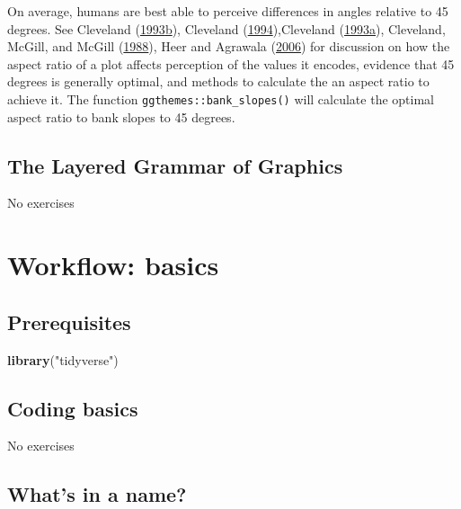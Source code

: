 \documentclass[]{book}
\newenvironment{Shaded}{\begin{snugshade}}{\end{snugshade}}
\newcommand{\KeywordTok}[1]{\textcolor[rgb]{0.13,0.29,0.53}{\textbf{#1}}}
\newcommand{\NormalTok}[1]{#1}
\newcommand{\StringTok}[1]{\textcolor[rgb]{0.31,0.60,0.02}{#1}}
\theoremstyle{plain}
\theoremstyle{remark}
\begin{document}
On average, humans are best able to perceive differences in angles relative to 45 degrees.
See Cleveland (\protect\hyperlink{ref-Cleveland1993}{1993}\protect\hyperlink{ref-Cleveland1993}{b}), Cleveland (\protect\hyperlink{ref-Cleveland1994}{1994}),Cleveland (\protect\hyperlink{ref-Cleveland1993a}{1993}\protect\hyperlink{ref-Cleveland1993a}{a}), Cleveland, McGill, and McGill (\protect\hyperlink{ref-ClevelandMcGillMcGill1988}{1988}), Heer and Agrawala (\protect\hyperlink{ref-HeerAgrawala2006}{2006}) for discussion on how the aspect ratio of a plot affects perception of the values it encodes, evidence that 45 degrees is generally optimal, and methods to calculate the an aspect ratio to achieve it.
The function \texttt{ggthemes::bank\_slopes()} will calculate the optimal aspect ratio to bank slopes to 45 degrees.

\hypertarget{the-layered-grammar-of-graphics}{%
\section{The Layered Grammar of Graphics}\label{the-layered-grammar-of-graphics}}

No exercises

\hypertarget{workflow-basics}{%
\chapter{Workflow: basics}\label{workflow-basics}}

\hypertarget{prerequisites}{%
\section*{Prerequisites}\label{prerequisites}}

\begin{Shaded}
\begin{Highlighting}[]
\KeywordTok{library}\NormalTok{(}\StringTok{"tidyverse"}\NormalTok{)}
\end{Highlighting}
\end{Shaded}

\hypertarget{coding-basics}{%
\section{Coding basics}\label{coding-basics}}

No exercises

\hypertarget{whats-in-a-name}{%
\section{What's in a name?}\label{whats-in-a-name}}
\end{document}
